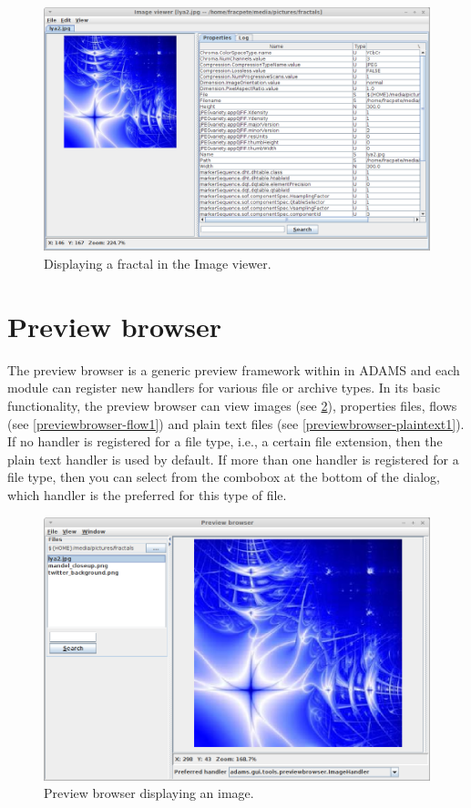 \begin{figure}[htb]
  \centering
  \includegraphics[width=12.0cm]{images/imageviewer1.png}
  \caption{Displaying a fractal in the Image viewer.}
  \label{imageviewer1}
\end{figure}

\section{Preview browser}
The preview browser is a generic preview framework within in ADAMS and each
module can register new handlers for various file or archive types. In its basic
functionality, the preview browser can view images (see
\ref{previewbrowser-image1}), properties files, flows (see
\ref{previewbrowser-flow1}) and plain text files (see
\ref{previewbrowser-plaintext1}). If no handler is registered for a file type,
i.e., a certain file extension, then the plain text handler is used by default.
If more than one handler is registered for a file type, then you can select
from the combobox at the bottom of the dialog, which handler is the preferred
for this type of file.

\begin{figure}[htb]
  \centering
  \includegraphics[width=12.0cm]{images/previewbrowser-image1.png}
  \caption{Preview browser displaying an image.}
  \label{previewbrowser-image1}
\end{figure}

